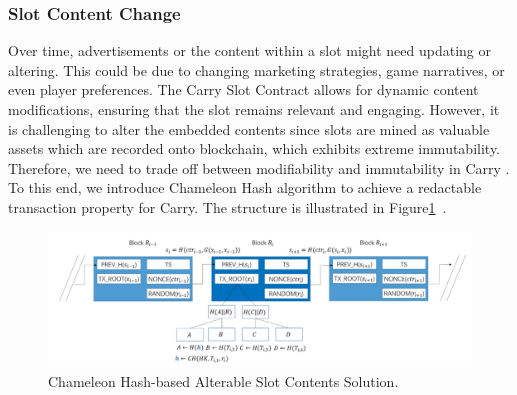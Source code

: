 \subsubsection{Slot Content Change}

Over time, advertisements or the content within a slot might need updating or altering. This could be due to changing marketing strategies, game narratives, or even player preferences. The Carry Slot Contract allows for dynamic content modifications, ensuring that the slot remains relevant and engaging. However, it is challenging to alter the embedded contents since slots are mined as valuable assets which are recorded onto blockchain, which exhibits extreme immutability. Therefore, we need to trade off between modifiability and immutability in Carry \cite{ye2023survey}. To this end, we introduce Chameleon Hash algorithm to achieve a redactable transaction property for Carry. The structure is illustrated in Figure\ref{fig:chameleon}~\cite{wu2021quantum}.

\begin{figure}[!htb]
    \centering
    \includegraphics[width=\textwidth]{chameleon hash.png}
    \caption{Chameleon Hash-based Alterable Slot Contents Solution.}
    \label{fig:chameleon}
\end{figure}

